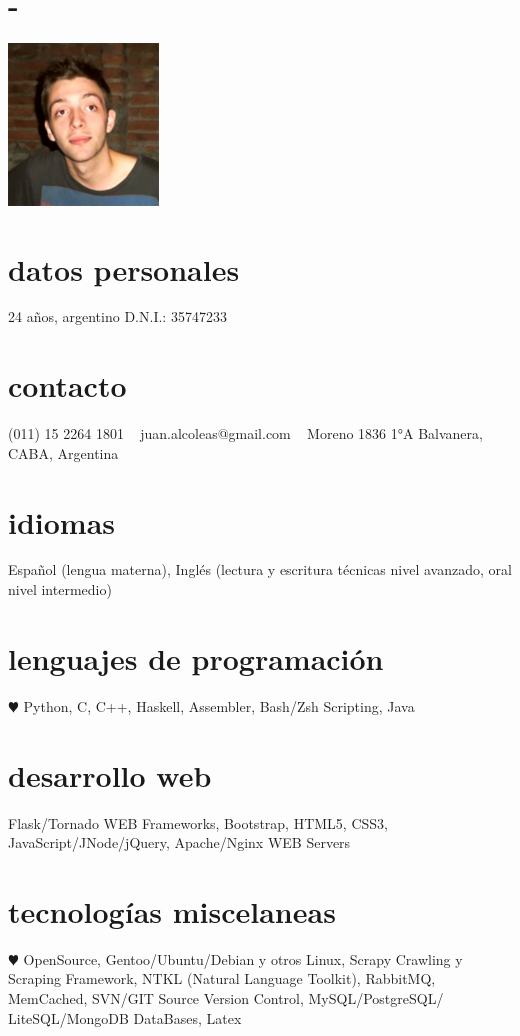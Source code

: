 \documentclass[espanol]{cv-style}     %
\begin{document}
\lastupdated

\begin{aside}
\section{-}
\includegraphics[width=4cm]{22}
%
\section{datos personales}
24 años, argentino
D.N.I.: 35747233
%
\section{contacto}
(011) 15 2264 1801
~
juan.alcoleas@gmail.com
~
Moreno 1836 1°A
Balvanera, CABA, Argentina
%
\section{idiomas}
Español (lengua materna),
Inglés (lectura y escritura técnicas nivel avanzado, oral nivel intermedio)
%
\section{lenguajes de programación}
{\color{red} $\varheartsuit$} Python, C, C++, Haskell, Assembler, Bash/Zsh Scripting, Java
%
\section{desarrollo web}
Flask/Tornado WEB Frameworks, Bootstrap, HTML5, CSS3, JavaScript/JNode/jQuery, Apache/Nginx WEB Servers
%
\section{tecnologías miscelaneas}
{\color{red} $\varheartsuit$} OpenSource, Gentoo/Ubuntu/Debian y otros Linux, Scrapy Crawling y Scraping Framework, NTKL (Natural Language Toolkit), RabbitMQ, MemCached, SVN/GIT Source Version Control, MySQL/PostgreSQL/ LiteSQL/MongoDB DataBases, Latex
%
\end{aside}
\vspace{0.2cm}
\end{document}
